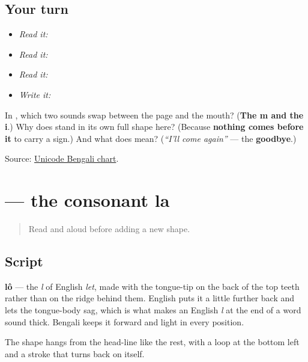 \subsection*{Your turn}
\begin{itemize}
\raggedright
  \item \emph{Read it:} 
  \item \emph{Read it:} 
  \item \emph{Read it:} 
  \item \emph{Write it:} 
\end{itemize}

\begin{tcolorbox}[breakable,colback=teal!4,colframe=teal!35!black,title={Before you move on}]
In \textbf{}, which two sounds swap between the page and the mouth? (\textbf{The m and the i}.) Why does \textbf{} stand in its own full shape here? (Because \textbf{nothing comes before it} to carry a sign.) And what does \textbf{} mean? (\emph{\textquotedblleft{}I'll come again\textquotedblright{}} — the \textbf{goodbye}.)

Source: \href{https://www.unicode.org/charts/PDF/U0980.pdf}{Unicode Bengali chart}.
\end{tcolorbox}
\section[lô]{ — the consonant la}

\label{lesson:BN-W02-la}



\begin{quote}
Read \textbf{} and \textbf{} aloud before adding a new shape.
\end{quote}

\subsection*{Script}
\begin{quote}
\end{quote}

\textbf{lô} — the \emph{l} of English \emph{let}, made with the tongue-tip on the back of the top teeth rather than on the ridge behind them. English puts it a little further back and lets the tongue-body sag, which is what makes an English \emph{l} at the end of a word sound thick. Bengali keeps it forward and light in every position.

The shape hangs from the head-line like the rest, with a loop at the bottom left and a stroke that turns back on itself.


